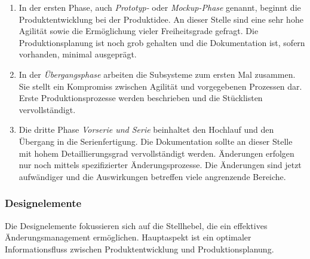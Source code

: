 \begin{enumerate}
 \item In der ersten Phase, auch \textit{Prototyp-} oder \textit{Mockup-Phase} genannt, beginnt die Produktentwicklung bei der Produktidee. An dieser Stelle sind eine sehr hohe Agilität sowie die Ermöglichung vieler Freiheitsgrade gefragt. Die Produktionsplanung ist noch grob gehalten und die Dokumentation ist, sofern vorhanden, minimal ausgeprägt. 
 \item In der \textit{Übergangsphase} arbeiten die Subsysteme zum ersten Mal zusammen. Sie stellt ein Kompromiss zwischen Agilität und vorgegebenen Prozessen dar. Erste Produktionsprozesse werden beschrieben und die Stücklisten vervollständigt. 
 \item Die dritte Phase \textit{Vorserie und Serie} beinhaltet den Hochlauf und den Übergang in die Serienfertigung. Die Dokumentation sollte an dieser Stelle mit hohem Detaillierungsgrad vervollständigt werden. Änderungen erfolgen nur noch mittels spezifizierter Änderungsprozesse. Die Änderungen sind jetzt aufwändiger und die Auswirkungen betreffen viele angrenzende Bereiche. 
\end{enumerate}

\subsubsection*{Designelemente}
Die Designelemente fokussieren sich auf die Stellhebel, die ein effektives Änderungsmanagement ermöglichen. Hauptaspekt ist ein optimaler Informationsfluss zwischen Produktentwicklung und Produktionsplanung. 

